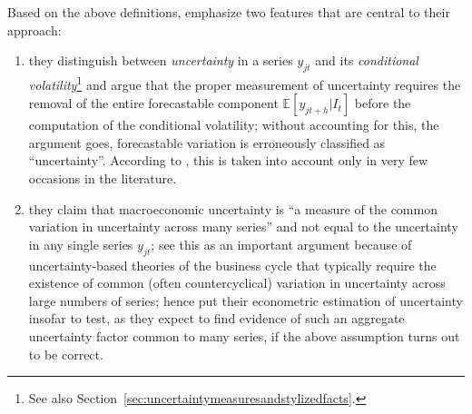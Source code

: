 \documentclass[a4paper,11pt,listof=nochaptergap,oneside,pointednumbers,bibtotoc,bigheadings,liststotoc,hidelinks]{scrbook}
\theoremstyle{mysatz}
\theoremstyle{mydefinition}
\theoremstyle{mytheorem}
\theoremstyle{mybemerkung}
\begin{document}
Based on the above definitions, \citet{juradoetal:15} emphasize two features that are central to their approach:
\begin{enumerate}
	\item they distinguish between \textit{uncertainty} in a series $y_{jt}$ and its \textit{conditional volatility}\footnote{See also Section~\ref{sec:uncertaintymeasuresandstylizedfacts}.} and argue that the proper measurement of uncertainty requires the removal of the entire forecastable component $\mathbb{E}[y_{jt+h}|I_t]$ before the computation of the conditional volatility; without accounting for this, the argument goes, forecastable variation is erroneously classified as ``uncertainty''. According to \citet{juradoetal:15}, this is taken into account only in very few occasions in the literature.
	\item they claim that macroeconomic uncertainty is ``a measure of the common variation in uncertainty across many series'' and not equal to the uncertainty in any single series $y_{jt}$; \citet{juradoetal:15} see this as an important argument because of uncertainty-based theories of the business cycle that typically require the existence of common (often countercyclical) variation in uncertainty across large numbers of series; \citet{juradoetal:15} hence put their econometric estimation of uncertainty insofar to test, as they expect to find evidence of such an aggregate uncertainty factor common to many series, if the above assumption turns out to be correct.
\end{enumerate}
\end{document}
